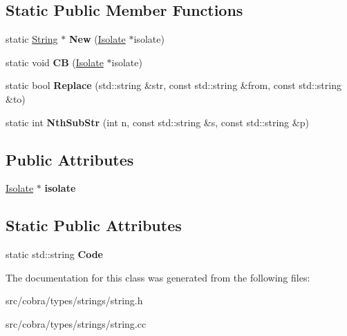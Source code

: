 \subsection*{Static Public Member Functions}
\begin{DoxyCompactItemize}
\item 
\hypertarget{class_cobra_1_1internal_1_1_string_a28d6c61f4968dfad01db2090396698b8}{static \hyperlink{class_cobra_1_1internal_1_1_string}{String} $\ast$ {\bfseries New} (\hyperlink{class_cobra_1_1internal_1_1_isolate}{Isolate} $\ast$isolate)}\label{class_cobra_1_1internal_1_1_string_a28d6c61f4968dfad01db2090396698b8}

\item 
\hypertarget{class_cobra_1_1internal_1_1_string_a8ae90062b201970f08e47c3d0ff02bb3}{static void {\bfseries C\+B} (\hyperlink{class_cobra_1_1internal_1_1_isolate}{Isolate} $\ast$isolate)}\label{class_cobra_1_1internal_1_1_string_a8ae90062b201970f08e47c3d0ff02bb3}

\item 
\hypertarget{class_cobra_1_1internal_1_1_string_a0f3c807dc47802de2f3d279d9211d33b}{static bool {\bfseries Replace} (std\+::string \&str, const std\+::string \&from, const std\+::string \&to)}\label{class_cobra_1_1internal_1_1_string_a0f3c807dc47802de2f3d279d9211d33b}

\item 
\hypertarget{class_cobra_1_1internal_1_1_string_a41218029ef549a386024d221c6fb35d4}{static int {\bfseries Nth\+Sub\+Str} (int n, const std\+::string \&s, const std\+::string \&p)}\label{class_cobra_1_1internal_1_1_string_a41218029ef549a386024d221c6fb35d4}

\end{DoxyCompactItemize}
\subsection*{Public Attributes}
\begin{DoxyCompactItemize}
\item 
\hypertarget{class_cobra_1_1internal_1_1_string_a28e94994ccde2b2a3f07fe7d97752cf4}{\hyperlink{class_cobra_1_1internal_1_1_isolate}{Isolate} $\ast$ {\bfseries isolate}}\label{class_cobra_1_1internal_1_1_string_a28e94994ccde2b2a3f07fe7d97752cf4}

\end{DoxyCompactItemize}
\subsection*{Static Public Attributes}
\begin{DoxyCompactItemize}
\item 
\hypertarget{class_cobra_1_1internal_1_1_string_a59dd1e3e92219c5a0e2d929912139e32}{static std\+::string {\bfseries Code}}\label{class_cobra_1_1internal_1_1_string_a59dd1e3e92219c5a0e2d929912139e32}

\end{DoxyCompactItemize}


The documentation for this class was generated from the following files\+:\begin{DoxyCompactItemize}
\item 
src/cobra/types/strings/string.\+h\item 
src/cobra/types/strings/string.\+cc\end{DoxyCompactItemize}
